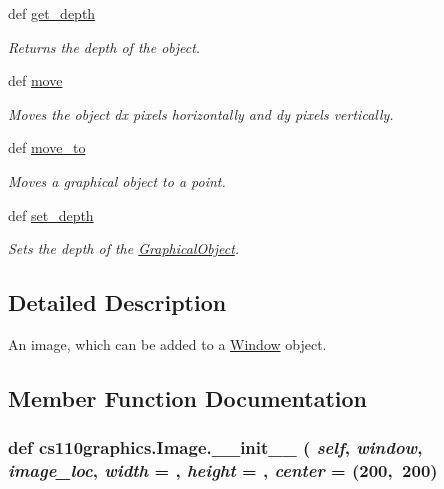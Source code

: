 \begin{DoxyCompactItemize}
def \hyperlink{classcs110graphics_1_1GraphicalObject_a6d9f5718cd0cf249e0d2842971bae17f}{get\_\-depth}
\begin{DoxyCompactList}\small\item\em Returns the depth of the object. \item\end{DoxyCompactList}\item 
def \hyperlink{classcs110graphics_1_1GraphicalObject_aa64d270fb83efa4a54e1a7953512f9cd}{move}
\begin{DoxyCompactList}\small\item\em Moves the object dx pixels horizontally and dy pixels vertically. \item\end{DoxyCompactList}\item 
def \hyperlink{classcs110graphics_1_1GraphicalObject_abe2d480265df7ac9447205c52c6946df}{move\_\-to}
\begin{DoxyCompactList}\small\item\em Moves a graphical object to a point. \item\end{DoxyCompactList}\item 
def \hyperlink{classcs110graphics_1_1GraphicalObject_a20d76d4ee4419c3065d61deb6cbc6700}{set\_\-depth}
\begin{DoxyCompactList}\small\item\em Sets the depth of the \hyperlink{classcs110graphics_1_1GraphicalObject}{GraphicalObject}. \item\end{DoxyCompactList}\end{DoxyCompactItemize}


\subsection{Detailed Description}
An image, which can be added to a \hyperlink{classcs110graphics_1_1Window}{Window} object. 

\subsection{Member Function Documentation}
\hypertarget{classcs110graphics_1_1Image_a3b7c128fa18d85ff4a7586fac04a1bc2}{
\subsubsection[{\_\-\_\-init\_\-\_\-}]{\setlength{\rightskip}{0pt plus 5cm}def cs110graphics.Image.\_\-\_\-init\_\-\_\- ( {\em self}, \/   {\em window}, \/   {\em image\_\-loc}, \/   {\em width} = {}, \/   {\em height} = {}, \/   {\em center} = {\ttfamily (200,~200})}}
\label{classcs110graphics_1_1Image_a3b7c128fa18d85ff4a7586fac04a1bc2}


